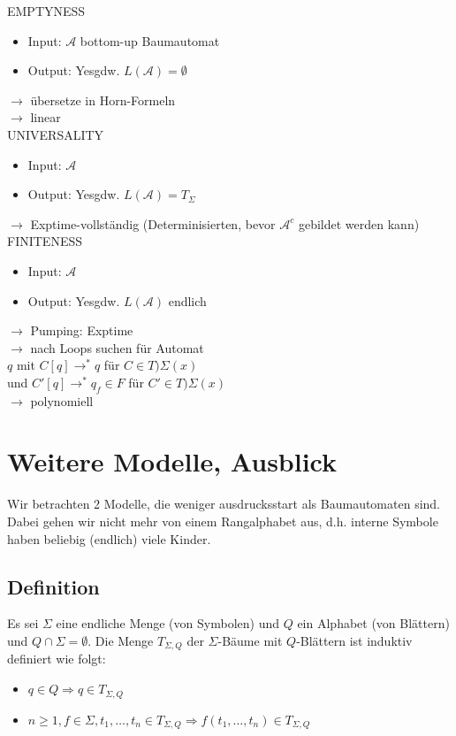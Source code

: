\documentclass[titlepage]{article}
\begin{document}
EMPTYNESS
\begin{itemize}
	\item Input: $\mathcal{A}$ bottom-up Baumautomat
	\item Output: \glqq Yes\grqq gdw. $L(\mathcal{A}) = \emptyset$
\end{itemize}

$\rightarrow$ \"ubersetze in Horn-Formeln\\
$\rightarrow$ linear\\

UNIVERSALITY
\begin{itemize}
	\item Input: $\mathcal{A}$
	\item Output: \glqq Yes\grqq gdw. $L(\mathcal{A}) = T_\Sigma$
\end{itemize}

$\rightarrow$ Exptime-vollst\"andig (Determinisierten, bevor $\mathcal{A}^c$ gebildet werden kann)\\

FINITENESS
\begin{itemize}
	\item Input: $\mathcal{A}$
	\item Output: \glqq Yes\grqq gdw. $L(\mathcal{A})$ endlich
\end{itemize}

$\rightarrow$ Pumping: Exptime\\
$\rightarrow$ nach Loops suchen f\"ur Automat\\
$q$ mit $C[q] \to^\ast q$ f\"ur $C \in T)\Sigma(x)$\\
und $C'[q] \to^\ast q_f \in F$ f\"ur $C' \in T)\Sigma(x)$\\
$\rightarrow$ polynomiell\\

\section{Weitere Modelle, Ausblick}

Wir betrachten 2 Modelle, die weniger ausdrucksstart als Baumautomaten sind.
Dabei gehen wir nicht mehr von einem Rangalphabet aus, d.h. interne Symbole haben
beliebig (endlich) viele Kinder.

\subsection{Definition}

Es sei $\Sigma$ eine endliche Menge (von Symbolen) und $Q$ ein Alphabet (von Bl\"attern) und
$Q \cap \Sigma = \emptyset$.
Die Menge $T_{\Sigma, Q}$ der $\Sigma$-B\"aume mit $Q$-Bl\"attern ist induktiv definiert wie folgt:
\begin{itemize}
	\item $q \in Q \Rightarrow q \in T_{\Sigma, Q}$
	\item $n \geq 1, f \in \Sigma, t_1, \dots, t_n \in T_{\Sigma, Q}
		\Rightarrow f(t_1, \dots, t_n) \in T_{\Sigma, Q}$
\end{itemize}
\end{document}
